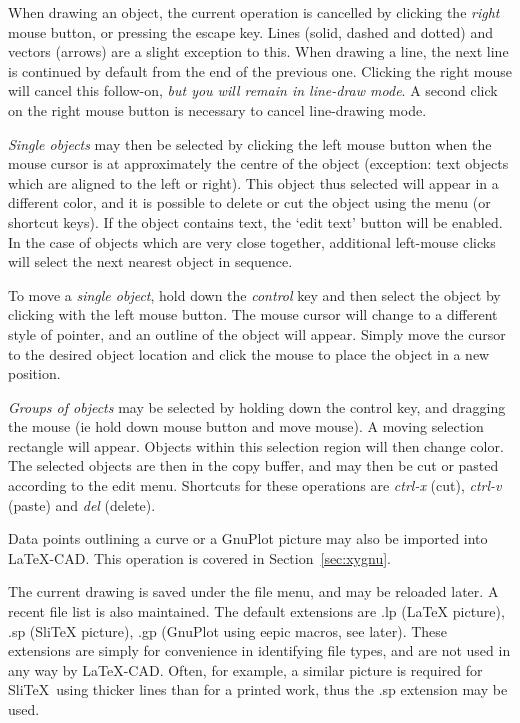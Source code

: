 \documentclass[a4paper]{article}
\begin{document}
When drawing an object, the current operation is cancelled by clicking
the \textit{right} mouse button, or pressing the escape key. Lines (solid,
dashed and dotted) and vectors (arrows) are a slight exception to this.
When drawing a line, the next line is continued by default from the
end of the previous one. Clicking the right mouse will cancel this follow-on,
\textit{but you will remain in line-draw mode}. A second click on the right mouse
button is necessary to cancel line-drawing mode.

\textit{Single objects} may then be selected by clicking the left mouse button when
the mouse cursor is at approximately the centre of the object (exception:
text objects which are aligned to the left or right).
This object thus selected will appear in a different color, and it is
possible to delete or cut the object using the menu (or shortcut keys).
If the object contains text, the `edit text' button will be enabled.
In the case of objects which are very close together, additional left-mouse
clicks will select the next nearest object in sequence.

To move a \textit{single object}, hold down the \textit{control} key and then
select the object by clicking with the left mouse button. The mouse
cursor will change to a different style of pointer, and an outline of the
object will appear. Simply move the cursor to the desired object location
and click the mouse to place the object in a new position.

\textit{Groups of objects} may be selected by holding down the control key, and
dragging the mouse (ie hold down mouse button and move mouse). A moving
selection rectangle will appear. Objects within this selection region will
then change color.
The selected objects are then in the copy buffer, and may then be cut or
pasted according to the edit menu. Shortcuts for these operations are
\textit{ctrl-x} (cut), \textit{ctrl-v} (paste) and \textit{del} (delete).

Data points outlining a curve or a GnuPlot picture may also be
imported into LaTeX-CAD. This operation is covered in
Section~\ref{sec:xygnu}.

The current drawing is saved under the file menu, and may be reloaded
later. A recent file list is also maintained. The default extensions
are .lp (\LaTeX\/ picture), .sp (Sli\TeX\/ picture), .gp (GnuPlot using
eepic macros, see later). These extensions are simply for convenience
in identifying file types, and are not used in any way by LaTeX-CAD.
Often, for example, a similar picture is required for Sli\TeX\ using
thicker lines than for a printed work, thus the .sp extension may
be used.
\end{document}
